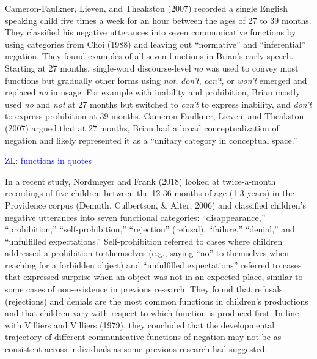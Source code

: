 \documentclass[
  english,
  man,floatsintext]{apa6}
\begin{document}
Cameron-Faulkner, Lieven, and Theakston (2007) recorded a single English speaking child five times a week for an hour between the ages of 27 to 39 months. They classified his negative utterances into seven communicative functions by using categories from Choi (1988) and leaving out ``normative'' and ``inferential'' negation. They found examples of all seven functions in Brian's early speech. Starting at 27 months, single-word discourse-level \emph{no} was used to convey most functions but gradually other forms using \emph{not}, \emph{don't}, \emph{can't}, or \emph{won't} emerged and replaced \emph{no} in usage. For example with inability and prohibition, Brian mostly used \emph{no} and \emph{not} at 27 months but switched to \emph{can't} to express inability, and \emph{don't} to express prohibition at 39 months. Cameron-Faulkner, Lieven, and Theakston (2007) argued that at 27 months, Brian had a broad conceptualization of negation and likely represented it as a ``unitary category in conceptual space.''

\textcolor{blue}{ZL: functions in quotes}

In a recent study, Nordmeyer and Frank (2018) looked at twice-a-month recordings of five children between the 12-36 months of age (1-3 years) in the Providence corpus (Demuth, Culbertson, \& Alter, 2006) and classified children's negative utterances into seven functional categories: ``disappearance,'' ``prohibition,'' ``self-prohibition,'' ``rejection'' (refusal), ``failure,'' ``denial,'' and ``unfulfilled expectations.'' Self-prohibition referred to cases where children addressed a prohibition to themselves (e.g., saying ``no'' to themselves when reaching for a forbidden object) and ``unfulfilled expectations'' referred to cases that expressed surprise when an object was not in an expected place, similar to some cases of non-existence in previous research. They found that refusals (rejections) and denials are the most common functions in children's productions and that children vary with respect to which function is produced first. In line with Villiers and Villiers (1979), they concluded that the developmental trajectory of different communicative functions of negation may not be as consistent across individuals as some previous research had suggested.
\end{document}
